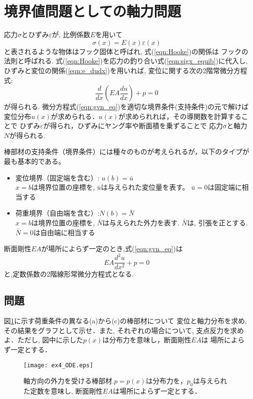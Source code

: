 \documentclass[10pt,a4j]{jbook}
\begin{document}
\section{境界値問題としての軸力問題}
応力$\sigma$とひずみ$\varepsilon$が, 比例係数$E$を用いて
\begin{equation}
	\sigma(x) =E(x) \varepsilon (x)
	\label{eqn:Hooke}
\end{equation}
と表されるような物体はフック固体と呼ばれ, 式(\ref{eqn:Hooke})の関係は
フックの法則と呼ばれる. 式(\ref{eqn:Hooke})を応力の釣り合い式(\ref{eqn:sigx_equib})に代入し, 
ひずみと変位の関係(\ref{eqn:e_dudx})を用いれば, 
変位に関する次の2階常微分方程式:
\begin{equation}
	\frac{d}{dx}\left( EA \frac{du}{dx} \right)+p=0
	\label{eqn:gvn_eq}
\end{equation}
が得られる. 微分方程式(\ref{eqn:gvn_eq})を適切な境界条件(支持条件)の元で解けば
変位分布$u(x)$が求められる．$u(x)$が求められれば，その導関数を計算することで
ひずみ$\varepsilon$が得られ，ひずみにヤング率や断面積を乗ずることで
応力$\sigma$と軸力$N$が得られる.

棒部材の支持条件（境界条件）には種々のものが考えられるが，以下のタイプが最も基本的である。
\begin{itemize}
\item
変位境界（固定端を含む）: $u(b)=\bar{u}$\\
	$x=b$は境界位置の座標を, $\bar u$は与えられた変位量を表す。
	$\bar u=0$は固定端に相当する
\item
荷重境界（自由端を含む）:$N(b)=\bar{N}$\\
	 $x=b$は境界位置の座標を, $\bar N$は与えられた外力を表す.
	$\bar{N}$は, 引張を正とする. $\bar N=0$は自由端に相当する
\end{itemize}
断面剛性$EA$が場所によらず一定のとき,式(\ref{eqn:gvn_eq})は
\begin{equation}
	EA\frac{d^2u}{dx^2}+p=0
	\label{eqn:gvn_eq2}
\end{equation}
と,定数係数の2階線形常微分方程式となる.
\subsection{問題}
図\ref{fig:fig4}に示す荷重条件の異なる(a)から(c)の棒部材について
変位と軸力分布を求め, その結果をグラフとして示せ．また, それぞれの場合について, 
支点反力を求めよ．ただし, 図中に示した$p(x)$は分布力を意味し，断面剛性$EA$は
場所によらず一定とする．
\begin{figure}[h]
	\begin{center}
	\texttt{[image: ex4\_ODE.eps]} 
	\end{center}
	\caption{軸方向の外力を受ける棒部材.$p=p(x)$は分布力を，$p_0$は与えられた定数を意味し, 
	断面剛性$EA$は場所によらず一定とする．} 
	\label{fig:fig4}
\end{figure}
\end{document}
